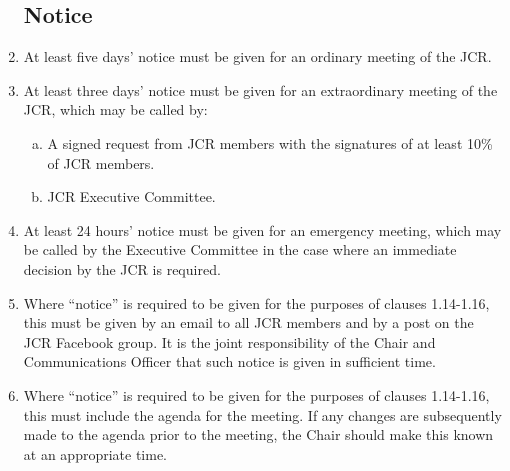 \documentclass[12pt]{article}  %
\begin{document}
\begin{enumerate}
    \subsection{Notice}
    \item At least five days’ notice must be given for an ordinary meeting of the JCR. 
    \item At least three days’ notice must be given for an extraordinary meeting of the JCR, which may be called by:
    \begin{enumerate}[(a)]
        \item A signed request from JCR members with the signatures of at least 10\% of JCR members.
        \item JCR Executive Committee.
    \end{enumerate}
    \item At least 24 hours’ notice must be given for an emergency meeting, which may be called by the Executive Committee in the case where an immediate decision by the JCR is required.
    \item Where “notice” is required to be given for the purposes of clauses 1.14-1.16, this must be given by an email to all JCR members and by a post on the JCR Facebook group. It is the joint responsibility of the Chair and Communications Officer that such notice is given in sufficient time.
    \item Where “notice” is required to be given for the purposes of clauses 1.14-1.16, this must include the agenda for the meeting. If any changes are subsequently made to the agenda prior to the meeting, the Chair should make this known at an appropriate time.

\end{enumerate}
\end{document}
